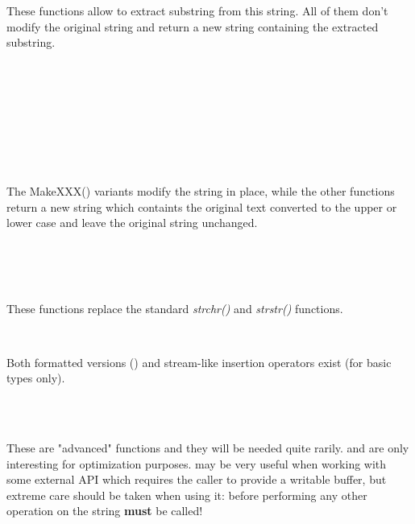 
These functions allow to extract substring from this string. All of them don't
modify the original string and return a new string containing the extracted
substring.

\\
\\
\\
\\
\\
\\
\\


The MakeXXX() variants modify the string in place, while the other functions
return a new string which containts the original text converted to the upper or
lower case and leave the original string unchanged.

\\
\\
\\


These functions replace the standard {\it strchr()} and {\it strstr()} 
functions.

\\


Both formatted versions () and stream-like
insertion operators exist (for basic types only).

\\
\\


These are "advanced" functions and they will be needed quite rarily. 
 and  are only
interesting for optimization purposes. 
 may be very useful when working with
some external API which requires the caller to provide a writable buffer, but
extreme care should be taken when using it: before performing any other
operation on the string  {\bf
must} be called!

